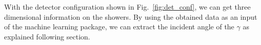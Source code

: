\documentclass[jkps,preprint,fleqn,showpacs,showkeys]{revtex4}
\begin{document}
With the detector configuration shown in Fig.~\ref{fig:det_conf}, we can get three dimensional information on the showers. By using the obtained data as an input of the machine learning package, we can extract the incident angle of the $\gamma$ as explained following section. 

\end{document}
